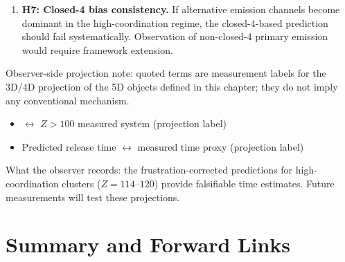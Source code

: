 \begin{edcopenbox}[title=Falsifiability Hooks]
\begin{enumerate}
    \item \textbf{H7: Closed-4 bias consistency.}
          If alternative emission channels become dominant in the
          high-coordination regime, the closed-4-based prediction should
          fail systematically. Observation of non-closed-4 primary emission
          would require framework extension.
\end{enumerate}
\end{edcopenbox}


\begin{observerbox}
Observer-side projection note: quoted terms are measurement labels for the
3D/4D projection of the 5D objects defined in this chapter; they do not
imply any conventional mechanism.

\begin{itemize}
    \item \HighCoordCluster{} $\leftrightarrow$ $Z > 100$ measured system (projection label)
    \item Predicted release time $\leftrightarrow$ measured time proxy (projection label)
\end{itemize}

What the observer records: the frustration-corrected predictions for
high-coordination clusters ($Z = 114$--$120$) provide falsifiable time
estimates. Future measurements will test these projections.
\end{observerbox}

\section{Summary and Forward Links}
\label{sec:sh:summary}

